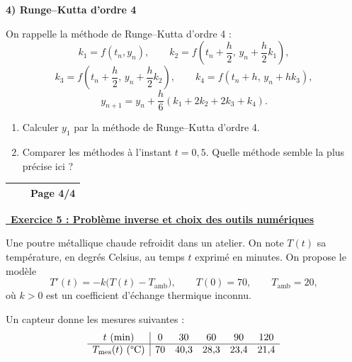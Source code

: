 \medskip

\textbf{4) Runge--Kutta d'ordre 4}

On rappelle la méthode de Runge--Kutta d'ordre 4 :
\[
k_1=f(t_n,y_n),\qquad
k_2=f\!\left(t_n+\frac h2,\,y_n+\frac h2 k_1\right),
\]
\[
k_3=f\!\left(t_n+\frac h2,\,y_n+\frac h2 k_2\right),\qquad
k_4=f(t_n+h,\,y_n+h k_3),
\]
\[
y_{n+1}=y_n+\frac h6(k_1+2k_2+2k_3+k_4).
\]

\begin{enumerate}
    \item Calculer $y_1$ par la méthode de Runge--Kutta d'ordre 4.
    \item Comparer les méthodes à l'instant $t=0{,}5$. Quelle méthode semble la plus précise ici ?
\end{enumerate}

\newpage

\begin{center}
    \renewcommand{\arraystretch}{1.5}
    \begin{tabular}{|>{\centering\arraybackslash}m{4cm}|>{\centering\arraybackslash}m{6cm}|>{\centering\arraybackslash}m{4cm}|}
        \hline
            \hspace{4cm}&\hspace{6cm} & \textbf{Page 4/4}\\
            \hline
    \end{tabular}
\end{center}

\vspace{1em}

\underline{\, \bf{Exercice 5 : Problème inverse et choix des outils numériques}}
\medskip

Une poutre métallique chaude refroidit dans un atelier. On note $T(t)$ sa température, en degrés Celsius, au temps $t$ exprimé en minutes.
On propose le modèle
\[
T'(t)=-k\bigl(T(t)-T_{\mathrm{amb}}\bigr),
\qquad T(0)=70,
\qquad T_{\mathrm{amb}}=20,
\]
où $k>0$ est un coefficient d'échange thermique inconnu.

Un capteur donne les mesures suivantes :
\[
\begin{array}{c|ccccc}
t\text{ (min)} & 0 & 30 & 60 & 90 & 120 \\
\hline
T_{\mathrm{mes}}(t)\text{ }(\text{\textdegree C}) & 70 & 40{,}3 & 28{,}3 & 23{,}4 & 21{,}4
\end{array}
\]


